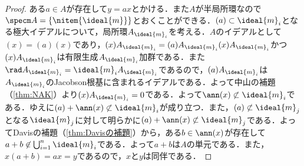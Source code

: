 \begin{proof}
	ある$a\in A$が存在して$y=ax$とかける．また$A$が半局所環なので$\specm A=\{\nitem{\ideal{m}}\}$とおくことができる．$(a)\subset\ideal{m}_i$となる極大イデアルについて，局所環$A_{\ideal{m}_i}$を考える．$A$のイデアルとして$(x)=(a)(x)$であり，$(x)A_{\ideal{m}_i}=(a)A_{\ideal{m}_i}(x)A_{\ideal{m}_i}$かつ$(x)A_{\ideal{m}_i}$は有限生成$A_{\ideal{m}_i}$加群である．また$\rad A_{\ideal{m}_i}=\ideal{m}_iA_{\ideal{m}_i}$であるので，$(a)A_{\ideal{m}_i}$は$A_{\ideal{m}_i}$のJacobson根基に含まれるイデアルである．よって中山の補題（\ref{thm:NAK}）より$(x)A_{\ideal{m}_i}=0$である．よって$\ann (x)\not\subset\ideal{m}_i$である．ゆえに$(a)+\ann (x)\not\subset\ideal{m}_i$が成り立つ．また，$(a)\not\subset\ideal{m}_j$となる$\ideal{m}_j$に対して明らかに$(a)+\ann (x)\not\subset\ideal{m}_j$である．よってDavisの補題（\ref{thm:Davisの補題}）から，ある$b\in\ann(x)$が存在して$a+b\not\in\bigcup_{i=1}^n\ideal{m}_i$である．よって$a+b$は$A$の単元である．また，$x(a+b)=ax=y$であるので，$x$と$y$は同伴である．
\end{proof}

